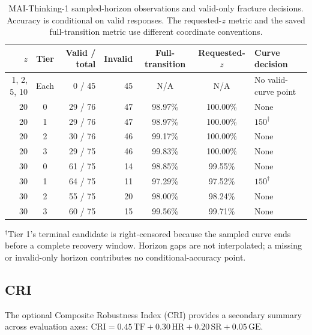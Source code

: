 \documentclass{article}
\begin{document}
\begin{table}[H]
\centering
\caption{MAI-Thinking-1 sampled-horizon observations and valid-only fracture decisions. Accuracy is conditional on valid responses. The requested-$z$ metric and the saved full-transition metric use different coordinate conventions.}
\label{tab:mai_fracture_reconciliation}
\scriptsize
\setlength{\tabcolsep}{3.2pt}
\begin{tabular}{r c r r c c l}
\toprule
\textbf{$z$} & \textbf{Tier} & \textbf{Valid / total} & \textbf{Invalid} &
\textbf{Full-transition} & \textbf{Requested-$z$} & \textbf{Curve decision} \\
\midrule
1, 2, 5, 10 & Each & 0 / 45 & 45 & N/A & N/A &
No valid-curve point \\
20 & 0 & 29 / 76 & 47 & 98.97\% & 100.00\% &
None \\
20 & 1 & 29 / 76 & 47 & 98.97\% & 100.00\% &
$150^\dagger$ \\
20 & 2 & 30 / 76 & 46 & 99.17\% & 100.00\% &
None \\
20 & 3 & 29 / 75 & 46 & 99.83\% & 100.00\% &
None \\
30 & 0 & 61 / 75 & 14 & 98.85\% & 99.55\% &
None \\
30 & 1 & 64 / 75 & 11 & 97.29\% & 97.52\% &
$150^\dagger$ \\
30 & 2 & 55 / 75 & 20 & 98.00\% & 98.24\% &
None \\
30 & 3 & 60 / 75 & 15 & 99.56\% & 99.71\% &
None \\
\bottomrule
\end{tabular}
\end{table}

$^\dagger$Tier 1's terminal candidate is right-censored because the sampled
curve ends before a complete recovery window. Horizon gaps are not interpolated;
a missing or invalid-only horizon contributes no conditional-accuracy point.

\subsection{CRI}
\label{app:CRI}
The optional Composite Robustness Index (CRI) provides a secondary summary across evaluation axes:
 $\text{CRI} = 0.45\,\text{TF}
+0.30\,\text{HR}
+0.20\,\text{SR}
+0.05\,\text{GE}$.
\end{document}
